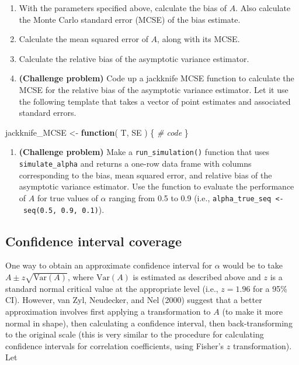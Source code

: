 \documentclass[
]{book}
\newenvironment{Shaded}{\begin{snugshade}}{\end{snugshade}}
\newcommand{\CommentTok}[1]{\textcolor[rgb]{0.56,0.35,0.01}{\textit{#1}}}
\newcommand{\ControlFlowTok}[1]{\textcolor[rgb]{0.13,0.29,0.53}{\textbf{#1}}}
\newcommand{\NormalTok}[1]{#1}
\newcommand{\OtherTok}[1]{\textcolor[rgb]{0.56,0.35,0.01}{#1}}
\providecommand{\tightlist}{%
  \setlength{\itemsep}{0pt}\setlength{\parskip}{0pt}}
\begin{document}
\begin{enumerate}
\def\labelenumi{\arabic{enumi}.}
\item
  With the parameters specified above, calculate the bias of \(A\). Also calculate the Monte Carlo standard error (MCSE) of the bias estimate.
\item
  Calculate the mean squared error of \(A\), along with its MCSE.
\item
  Calculate the relative bias of the asymptotic variance estimator.
\item
  \textbf{(Challenge problem)} Code up a jackknife MCSE function to calculate the MCSE for the relative bias of the asymptotic variance estimator. Let it use the following template that takes a vector of point estimates and associated standard errors.
\end{enumerate}

\begin{Shaded}
\begin{Highlighting}[]
\NormalTok{jackknife\_MCSE }\OtherTok{\textless{}{-}} \ControlFlowTok{function}\NormalTok{( T, SE ) \{}
  \CommentTok{\# code}
\NormalTok{\}}
\end{Highlighting}
\end{Shaded}

\begin{enumerate}
\def\labelenumi{\arabic{enumi}.}
\setcounter{enumi}{4}
\tightlist
\item
  \textbf{(Challenge problem)} Make a \texttt{run\_simulation()} function that uses \texttt{simulate\_alpha} and returns a one-row data frame with columns corresponding to the bias, mean squared error, and relative bias of the asymptotic variance estimator. Use the function to evaluate the performance of \(A\) for true values of \(\alpha\) ranging from 0.5 to 0.9 (i.e., \texttt{alpha\_true\_seq\ \textless{}-\ seq(0.5,\ 0.9,\ 0.1)}).
\end{enumerate}

\hypertarget{confidence-interval-coverage}{%
\subsection{Confidence interval coverage}\label{confidence-interval-coverage}}

One way to obtain an approximate confidence interval for \(\alpha\) would be to take \(A \pm z \sqrt{\text{Var}(A)}\), where \(\text{Var}(A)\) is estimated as described above and \(z\) is a standard normal critical value at the appropriate level (i.e., \(z = 1.96\) for a 95\% CI). However, van Zyl, Neudecker, and Nel (2000) suggest that a better approximation involves first applying a transformation to \(A\) (to make it more normal in shape), then calculating a confidence interval, then back-transforming to the original scale (this is very similar to the procedure for calculating confidence intervals for correlation coefficients, using Fisher's \(z\) transformation). Let
\end{document}
